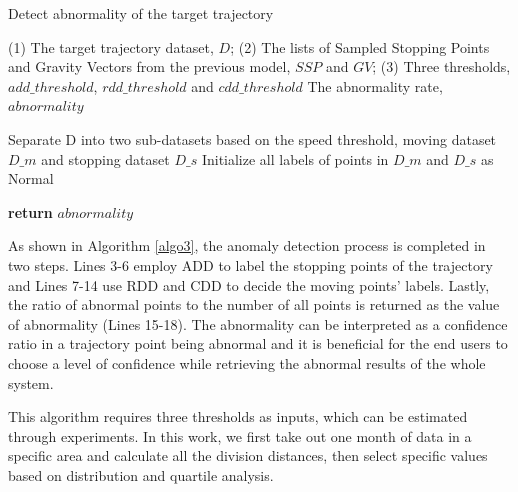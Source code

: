 \documentclass[12pt,glossary]{dalcsthesis}
\begin{document}
\begin{algorithm}
\caption{Detect abnormality of the target trajectory}
\label{algo3}
\begin{algorithmic}[1]
\Require (1) The target trajectory dataset, $D$; (2) The lists of Sampled Stopping Points and Gravity Vectors from the previous model, $SSP$ and $GV$; (3) Three thresholds, $add\_threshold$, $rdd\_threshold$ and $cdd\_threshold$
\Ensure The abnormality rate, $abnormality$

\State Separate D into two sub-datasets based on the speed threshold, moving dataset $D\_m$ and stopping dataset $D\_s$
\State Initialize all labels of points in $D\_m$ and $D\_s$ as Normal

    \EndIf
\EndFor

    \Else
        \EndIf
    \EndIf
\EndFor
{}

\State \textbf{return} $abnormality$
\end{algorithmic}
\end{algorithm}

As shown in Algorithm \ref{algo3}, the anomaly detection process is completed in two steps. Lines 3-6 employ ADD to label the stopping points of the trajectory and Lines 7-14 use RDD and CDD to decide the moving points' labels. Lastly, the ratio of abnormal points to the number of all points is returned as the value of abnormality (Lines 15-18). The abnormality can be interpreted as a confidence ratio in a trajectory point being abnormal and it is beneficial for the end users to  choose a level of confidence while retrieving the abnormal results of the whole system.

This algorithm requires three thresholds as inputs, which can be estimated through experiments. In this work, we first take out one month of data in a specific area and calculate all the division distances, then select specific values based on distribution and quartile analysis. 
\end{document}
